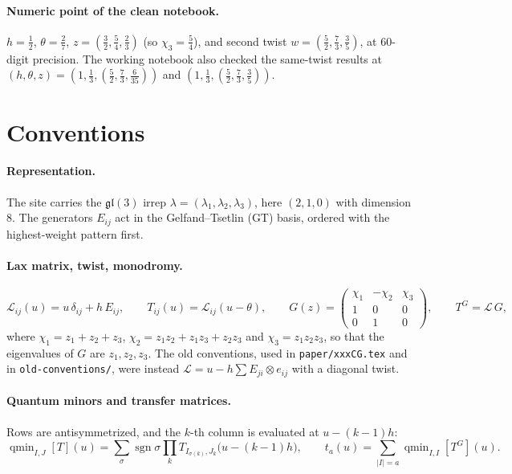 \documentclass[11pt]{article}
\newcommand{\nb}[1]{\texttt{#1}}
\newcommand{\qmin}{\operatorname{qmin}}
\begin{document}
\paragraph{Numeric point of the clean notebook.} $h=\tfrac12$, $\theta=\tfrac27$, $z=(\tfrac32,\tfrac54,\tfrac23)$ (so $\chi_3=\tfrac54$), and second twist $w=(\tfrac52,\tfrac73,\tfrac35)$, at 60-digit precision. The working notebook also checked the same-twist results at $(h,\theta,z)=(1,\tfrac13,(\tfrac52,\tfrac73,\tfrac6{35}))$ and $(1,\tfrac13,(\tfrac52,\tfrac73,\tfrac35))$.

\section{Conventions}\label{sec:conv}

\paragraph{Representation.} The site carries the $\mathfrak{gl}(3)$ irrep $\lambda=(\lambda_1,\lambda_2,\lambda_3)$, here $(2,1,0)$ with dimension 8. The generators $E_{ij}$ act in the Gelfand--Tsetlin (GT) basis, ordered with the highest-weight pattern first.

\paragraph{Lax matrix, twist, monodromy.}
\begin{equation}
\mathcal L_{ij}(u)=u\,\delta_{ij}+h\,E_{ij},\qquad T_{ij}(u)=\mathcal L_{ij}(u-\theta),\qquad
G(z)=\begin{pmatrix}\chi_1&-\chi_2&\chi_3\\1&0&0\\0&1&0\end{pmatrix},\qquad T^G=\mathcal L\,G ,
\end{equation}
where $\chi_1=z_1+z_2+z_3$, $\chi_2=z_1z_2+z_1z_3+z_2z_3$ and $\chi_3=z_1z_2z_3$, so that the eigenvalues of $G$ are $z_1,z_2,z_3$. The old conventions, used in \nb{paper/xxxCG.tex} and in \nb{old-conventions/}, were instead $\mathcal L=u-h\sum E_{ji}\otimes e_{ij}$ with a diagonal twist.

\paragraph{Quantum minors and transfer matrices.} Rows are antisymmetrized, and the $k$-th column is evaluated at $u-(k-1)h$:
\begin{equation}
\qmin_{I,J}[T](u)=\sum_{\sigma}\operatorname{sgn}\sigma\prod_{k}T_{I_{\sigma(k)},J_k}\big(u-(k-1)h\big),\qquad
t_a(u)=\sum_{|I|=a}\qmin_{I,I}[T^G](u).
\end{equation}
\end{document}
